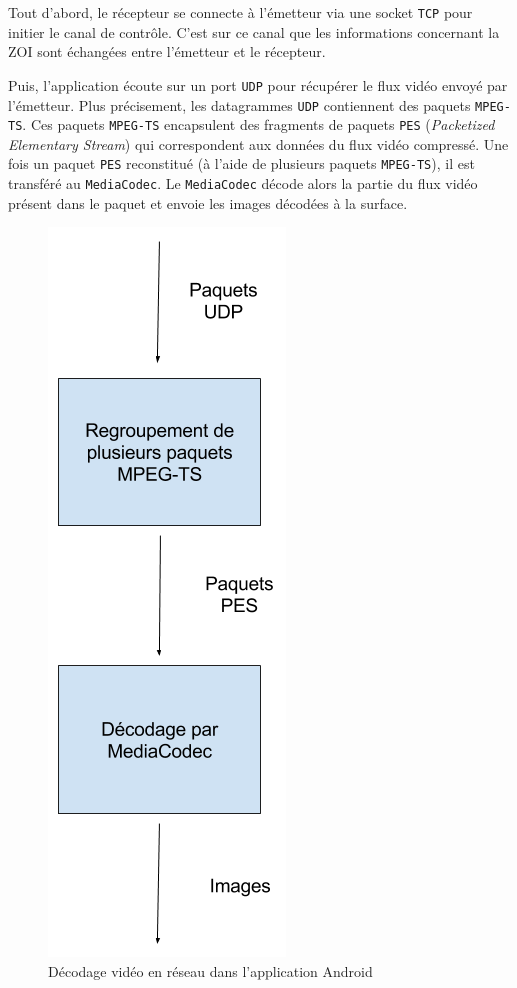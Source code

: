 \documentclass[11pt,a4paper]{article}
\begin{document}
\bigbreak
Tout d'abord, le récepteur se connecte à l'émetteur via une socket \texttt{TCP} pour initier le canal de contrôle.
C'est sur ce canal que les informations concernant la ZOI sont échangées entre l'émetteur et le récepteur.

\bigbreak
Puis, l'application écoute sur un port \texttt{UDP} pour récupérer le flux vidéo envoyé par l'émetteur.
Plus précisement, les datagrammes \texttt{UDP} contiennent des paquets \texttt{MPEG-TS}.
Ces paquets \texttt{MPEG-TS} encapsulent des fragments de paquets \texttt{PES} (\textit{Packetized Elementary Stream}) qui correspondent aux données du flux vidéo compressé.
Une fois un paquet \texttt{PES} reconstitué (à l'aide de plusieurs paquets \texttt{MPEG-TS}), il est transféré au \texttt{MediaCodec}.
Le \texttt{MediaCodec} décode alors la partie du flux vidéo présent dans le paquet et envoie les images décodées à la surface.

\begin{figure}[H]
\begin{center}
\includegraphics[scale=0.35]{images/decodage_video.png}
\end{center}
\caption{Décodage vidéo en réseau dans l'application Android}
\label{}
\end{figure}
\end{document}
